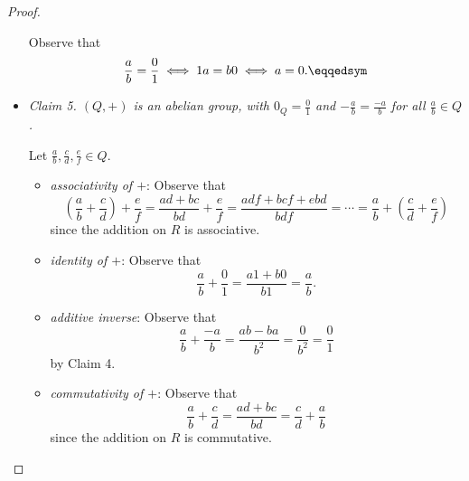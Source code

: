 \documentclass[pmath347]{subfiles}
\begin{document}
\begin{proof}
\begin{itemize}
                \begin{subproof}
                    Observe that
                    \begin{equation*}
                        \frac{a}{b} = \frac{0}{1} \iff 1a = b0 \iff a = 0. \eqqedsym
                    \end{equation*}
                \end{subproof}

            \item \textit{Claim 5. $\left( Q,+ \right)$ is an abelian group, with $0_Q = \frac{0}{1}$ and $-\frac{a}{b} = \frac{-a}{b}$ for all $\frac{a}{b}\in Q$.}

                \begin{subproof}
                    Let $\frac{a}{b},\frac{c}{d},\frac{e}{f}\in Q$.
                    \begin{itemize}
                        \item \textit{associativity of $+$}: Observe that
                            \begin{equation*}
                                \left( \frac{a}{b}+\frac{c}{d} \right) + \frac{e}{f} = \frac{ad+bc}{bd}+\frac{e}{f} = \frac{adf+bcf+ebd}{bdf} = \cdots = \frac{a}{b}+\left( \frac{c}{d}+\frac{e}{f} \right) 
                            \end{equation*}
                            since the addition on $R$ is associative.
                        \item \textit{identity of $+$}: Observe that
                            \begin{equation*}
                                \frac{a}{b}+\frac{0}{1} = \frac{a1+b0}{b1} = \frac{a}{b}.
                            \end{equation*}
                        \item \textit{additive inverse}: Observe that
                            \begin{equation*}
                                \frac{a}{b} + \frac{-a}{b} = \frac{ab-ba}{b^{2}} = \frac{0}{b^{2} } = \frac{0}{1}
                            \end{equation*}
                            by Claim 4.
                        \item \textit{commutativity of $+$}: Observe that
                            \begin{equation*}
                                \frac{a}{b}+\frac{c}{d} = \frac{ad+bc}{bd} = \frac{c}{d} + \frac{a}{b}
                            \end{equation*}
                            since the addition on $R$ is commutative. \qqqedsym
                    \end{itemize} 
                \end{subproof}


\end{itemize}
\end{proof}
\end{document}
